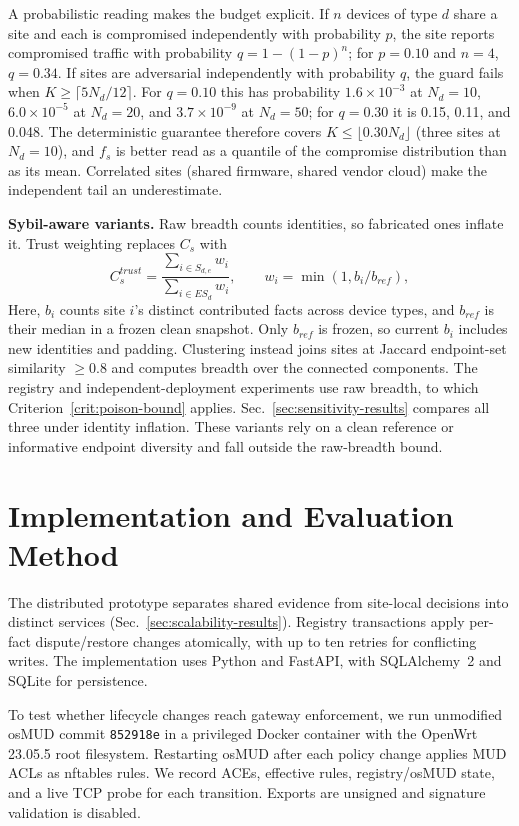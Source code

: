 \documentclass[journal]{IEEEtran}
\theoremstyle{definition}
\begin{document}
A probabilistic reading makes the budget explicit. If $n$ devices of type $d$ share a site and each is compromised independently with probability $p$, the site reports compromised traffic with probability $q=1-(1-p)^n$; for $p=0.10$ and $n=4$, $q=0.34$. If sites are adversarial independently with probability $q$, the guard fails when $K\ge\lceil5N_d/12\rceil$. For $q=0.10$ this has probability $1.6\times10^{-3}$ at $N_d=10$, $6.0\times10^{-5}$ at $N_d=20$, and $3.7\times10^{-9}$ at $N_d=50$; for $q=0.30$ it is 0.15, 0.11, and 0.048. The deterministic guarantee therefore covers $K\le\lfloor0.30N_d\rfloor$ (three sites at $N_d=10$), and $f_s$ is better read as a quantile of the compromise distribution than as its mean. Correlated sites (shared firmware, shared vendor cloud) make the independent tail an underestimate.

\textbf{Sybil-aware variants.} Raw breadth counts identities, so fabricated ones inflate it. Trust weighting replaces $C_s$ with
\[
C_s^{trust}=\frac{\sum_{i\in S_{d,e}}w_i}{\sum_{i\in ES_d}w_i},\qquad w_i=\min(1,b_i/b_{ref}),
\]
Here, $b_i$ counts site $i$'s distinct contributed facts across device types, and $b_{ref}$ is their median in a frozen clean snapshot. Only $b_{ref}$ is frozen, so current $b_i$ includes new identities and padding. Clustering instead joins sites at Jaccard endpoint-set similarity $\ge0.8$ and computes breadth over the connected components. The registry and independent-deployment experiments use raw breadth, to which Criterion~\ref{crit:poison-bound} applies. Sec.~\ref{sec:sensitivity-results} compares all three under identity inflation. These variants rely on a clean reference or informative endpoint diversity and fall outside the raw-breadth bound.



\section{Implementation and Evaluation Method}
\label{sec:impl}
The distributed prototype separates shared evidence from site-local decisions into distinct services (Sec.~\ref{sec:scalability-results}). Registry transactions apply per-fact dispute/restore changes atomically, with up to ten retries for conflicting writes. The implementation uses Python and FastAPI, with SQLAlchemy~2 and SQLite for persistence.

To test whether lifecycle changes reach gateway enforcement, we run unmodified osMUD commit \texttt{852918e} in a privileged Docker container with the OpenWrt 23.05.5 root filesystem. Restarting osMUD after each policy change applies MUD ACLs as nftables rules. We record ACEs, effective rules, registry/osMUD state, and a live TCP probe for each transition. Exports are unsigned and signature validation is disabled.
\end{document}
